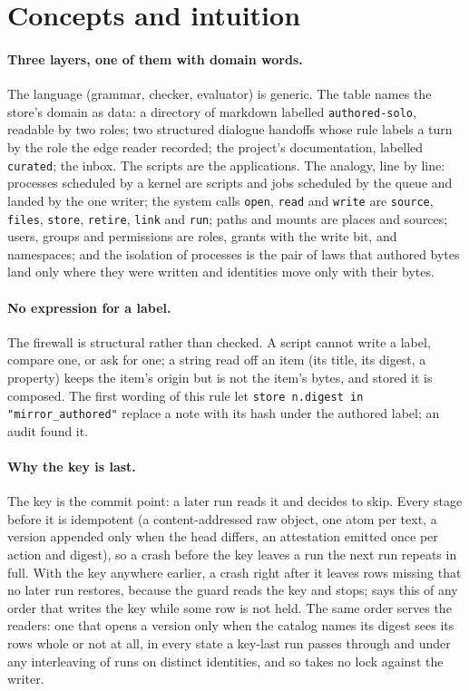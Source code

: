 \documentclass[11pt]{article}
\theoremstyle{plain}
\theoremstyle{definition}
\theoremstyle{remark}
\newcommand{\code}[1]{\texttt{#1}}
\begin{document}
\section{Concepts and intuition}

\paragraph{Three layers, one of them with domain words.}
The language (grammar, checker, evaluator) is generic. The table names the store's domain as
data: a directory of markdown labelled \code{authored-solo}, readable by two roles; two
structured dialogue handoffs whose rule labels a turn by the role the edge reader recorded; the
project's documentation, labelled \code{curated}; the inbox. The scripts are the applications.
The analogy, line by line: processes scheduled by a kernel are scripts and jobs scheduled by the
queue and landed by the one writer; the system calls \code{open}, \code{read} and \code{write}
are \code{source}, \code{files}, \code{store}, \code{retire}, \code{link} and \code{run}; paths
and mounts are places and sources; users, groups and permissions are roles, grants with the
write bit, and namespaces; and the isolation of processes is the pair of laws that authored
bytes land only where they were written and identities move only with their bytes.

\paragraph{No expression for a label.}
The firewall is structural rather than checked. A script cannot write a label, compare one, or
ask for one; a string read off an item (its title, its digest, a property) keeps the item's
origin but is not the item's bytes, and stored it is composed. The first wording of this rule
let \code{store n.digest in "mirror\_authored"} replace a note with its hash under the authored
label; an audit found it.

\paragraph{Why the key is last.}
The key is the commit point: a later run reads it and decides to skip. Every stage before it is
idempotent (a content-addressed raw object, one atom per text, a version appended only when the
head differs, an attestation emitted once per action and digest), so a crash before the key
leaves a run the next run repeats in full. With the key anywhere earlier, a crash right after it
leaves rows missing that no later run restores, because the guard reads the key and stops;
 says this of any order that writes the key while some row is not held. The
same order serves the readers: one that opens a version only when the catalog names its digest
sees its rows whole or not at all, in every state a key-last run passes through and under any
interleaving of runs on distinct identities, and so takes no lock against the writer.
\end{document}
